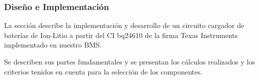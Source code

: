 \documentclass[10pt,a4paper]{article}
\begin{document}
%
%

\subsubsection{Diseño e Implementación}

La sección describe la implementación y desarrollo de un circuito cargador de
baterías de Ion-Litio a partir del \acrfull{CI} bq24610 de la firma Texas
Instruments implementado en nuestro \acrshort{BMS}.

Se describen sus partes fundamentales y se presentan los cálculos realizados y
los criterios tenidos en cuenta para la selección de los componentes. 
\end{document}
